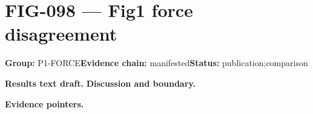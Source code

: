 \clearpage
\section{FIG-098 --- Fig1 force disagreement}
\label{figpage:fig-098}
\textbf{Group:} P1-FORCE\quad \textbf{Evidence chain:} manifested\quad \textbf{Status:} publication;comparison

\textbf{Results text draft.} 
\textbf{Discussion and boundary.} 


\textbf{Evidence pointers.}



\vfill
